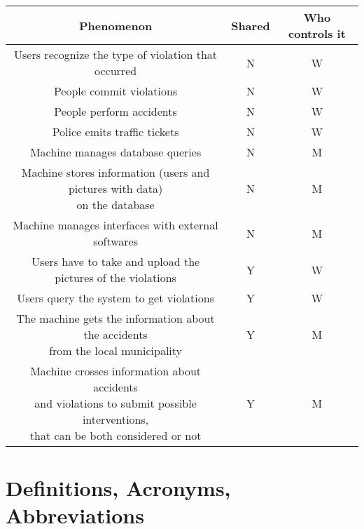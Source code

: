 \documentclass[../RASD.tex]{subfiles}
\begin{document}
        \newpage
        \begin{center}
            \begin{tabular}{ ||c|c|c|| }

                \hline
                \textbf{Phenomenon} & \textbf{Shared} & \textbf{Who controls it} \\ \hline
                Users recognize the type of violation that occurred & N & W \\ \hline
                People commit violations & N & W\\ \hline
                People perform accidents & N & W\\ \hline
                Police emits traffic tickets & N & W\\ \hline
                Machine manages database queries & N & M\\ \hline
                \makecell{Machine stores information (users and pictures with data)
                \\ on the database} & N & M\\ \hline
                Machine manages interfaces with external softwares & N & M\\ \hline
                Users have to take and upload the pictures of the violations & Y & W\\ \hline
                Users query the system to get violations & Y & W\\ \hline
                \makecell{The machine gets the information about the accidents
                \\from the local municipality} & Y & M\\ \hline
                \makecell{Machine crosses information about accidents
                \\and violations to submit possible interventions,
                \\that can be both considered or not} & Y & M\\
                \hline
            \end{tabular}
        \end{center}
    \newpage
    \section{Definitions, Acronyms, Abbreviations}\label{sec:definitions,-acronyms,-abbreviations}
\end{document}
